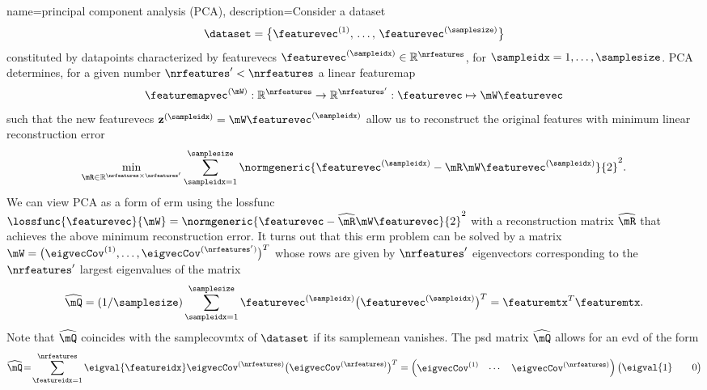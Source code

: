 {name={principal component analysis (PCA)}, 
	description={Consider a \gls{dataset} 
				$$\dataset = \big\{ \featurevec^{(1)}, \,\ldots, \,\featurevec^{(\samplesize)} \big\}$$
			    constituted by \glspl{datapoint} characterized by \glspl{featurevec} 
				$\featurevec^{(\sampleidx)} \in \mathbb{R}^{\nrfeatures}$, for $\sampleidx=1,\ldots,\samplesize$.
				PCA determines, for a given number 
				$\nrfeatures' < \nrfeatures$ a linear \gls{featuremap} 
				$$\featuremapvec^{(\mW)}: \mathbb{R}^{\nrfeatures} \rightarrow 
				\mathbb{R}^{\nrfeatures'}: \featurevec \mapsto \mW \featurevec$$ 
				such that the new \glspl{featurevec} 
				$\mathbf{z}^{(\sampleidx)} = \mW \featurevec^{(\sampleidx)}$ 
				allow us to reconstruct the original \glspl{feature} with  
				\gls{minimum} linear reconstruction error \cite{MLBasics,hastie01statisticallearning,BishopBook}
				$$\min_{\mR \in \mathbb{R}^{\nrfeatures \times \nrfeatures'}} 
				\sum_{\sampleidx=1}^{\samplesize} 
				\normgeneric{\featurevec^{(\sampleidx)}- \mR \mW \featurevec^{(\sampleidx)}}{2}^{2}.$$ 
				We can view PCA as a form of \gls{erm} using the \gls{lossfunc} 
				$\lossfunc{\featurevec}{\mW} = \normgeneric{\featurevec- \widehat{\mR} \mW \featurevec}{2}^{2}$ with a 
				reconstruction \gls{matrix} $\widehat{\mR}$ 
				that achieves the above minimum reconstruction error. It turns 
				out that this \gls{erm} problem can be solved by a \gls{matrix}  
				$\mW = \big(\eigvecCov^{(1)},\ldots,\eigvecCov^{(\nrfeatures')}\big)^{T}$ 
				whose rows are given by $\nrfeatures'$ 
				\glspl{eigenvector} corresponding to the $\nrfeatures'$ largest 
				\glspl{eigenvalue} of the \gls{matrix} 
				$$\widehat{\mQ} = (1/\samplesize) \sum_{\sampleidx=1}^{\samplesize} 
				\featurevec^{(\sampleidx)} \big( \featurevec^{(\sampleidx)}\big)^{T}
				=\featuremtx^{T} \featuremtx.$$ 
				Note that $\widehat{\mQ}$ coincides with the \gls{samplecovmtx} of 
				$\dataset$ if its \gls{samplemean} vanishes. The \gls{psd} \gls{matrix} 
				$\widehat{\mQ}$ allows for an \gls{evd} of the form 
				\cite{MeyerMatrixAnalysis,HornMatAnalysis} 
				$$\widehat{\mQ}\!=\!\sum_{\featureidx=1}^{\nrfeatures} \eigval{\featureidx} 
					\eigvecCov^{(\nrfeatures)} \big( \eigvecCov^{(\nrfeatures)} \big)^{T}=
					\begin{pmatrix}
					\eigvecCov^{(1)} & \cdots & \eigvecCov^{(\nrfeatures)}
					\end{pmatrix}
					\begin{pmatrix}
					\eigval{1}        &        & 0 \\

\end{pmatrix}$$}}
